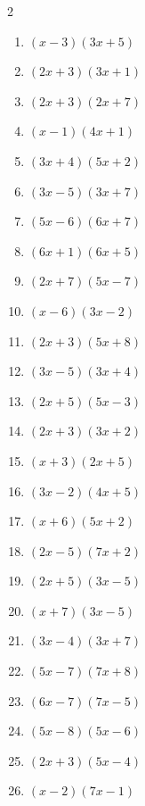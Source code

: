 \documentclass[11pt,oneside]{book}
\begin{document}
\begin{multicols}{2}
\begin{enumerate}[leftmargin=*,label=\textbf{F\arabic*.},itemsep=0.45\baselineskip]
\item $ \left(x - 3\right) \left(3 x + 5\right) $
\item $ \left(2 x + 3\right) \left(3 x + 1\right) $
\item $ \left(2 x + 3\right) \left(2 x + 7\right) $
\item $ \left(x - 1\right) \left(4 x + 1\right) $
\item $ \left(3 x + 4\right) \left(5 x + 2\right) $
\item $ \left(3 x - 5\right) \left(3 x + 7\right) $
\item $ \left(5 x - 6\right) \left(6 x + 7\right) $
\item $ \left(6 x + 1\right) \left(6 x + 5\right) $
\item $ \left(2 x + 7\right) \left(5 x - 7\right) $
\item $ \left(x - 6\right) \left(3 x - 2\right) $
\item $ \left(2 x + 3\right) \left(5 x + 8\right) $
\item $ \left(3 x - 5\right) \left(3 x + 4\right) $
\item $ \left(2 x + 5\right) \left(5 x - 3\right) $
\item $ \left(2 x + 3\right) \left(3 x + 2\right) $
\item $ \left(x + 3\right) \left(2 x + 5\right) $
\item $ \left(3 x - 2\right) \left(4 x + 5\right) $
\item $ \left(x + 6\right) \left(5 x + 2\right) $
\item $ \left(2 x - 5\right) \left(7 x + 2\right) $
\item $ \left(2 x + 5\right) \left(3 x - 5\right) $
\item $ \left(x + 7\right) \left(3 x - 5\right) $
\item $ \left(3 x - 4\right) \left(3 x + 7\right) $
\item $ \left(5 x - 7\right) \left(7 x + 8\right) $
\item $ \left(6 x - 7\right) \left(7 x - 5\right) $
\item $ \left(5 x - 8\right) \left(5 x - 6\right) $
\item $ \left(2 x + 3\right) \left(5 x - 4\right) $
\item $ \left(x - 2\right) \left(7 x - 1\right) $
\end{enumerate}
\end{multicols}
\end{document}
